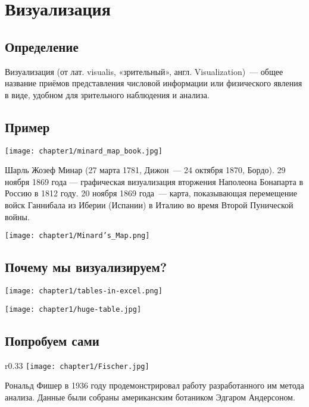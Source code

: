 \section{Визуализация}
\subsection{Определение}
Визуализация (от лат. visualis, «зрительный», англ. Visualization)~— общее название приёмов представления числовой информации или физического явления в виде, удобном для зрительного наблюдения и анализа\cite{wiki:visualization_def}.

\subsection{Пример}
\texttt{[image: chapter1/minard\_map\_book.jpg]}

Шарль Жозеф Минар (27 марта 1781, Дижон~— 24 октября 1870, Бордо). 29 ноября 1869 года — графическая визуализация вторжения Наполеона Бонапарта в Россию в 1812 году. 20 ноября 1869 года~— карта, показывающая перемещение войск Ганнибала из Иберии (Испании) в Италию во время Второй Пунической войны. 

\texttt{[image: chapter1/Minard's\_Map.png]}

\subsection{Почему мы визуализируем?}

\texttt{[image: chapter1/tables-in-excel.png]}

\texttt{[image: chapter1/huge-table.jpg]} %

\subsection{Попробуем сами}

\begin{wrapfigure}{r}{0.33\textwidth}
    \vspace{-0.5cm}
    \texttt{[image: chapter1/Fischer.jpg]}
\end{wrapfigure}
Рональд Фишер в 1936 году продемонстрировал работу разработанного им метода анализа. Данные были собраны американским ботаником Эдгаром Андерсоном. \\

